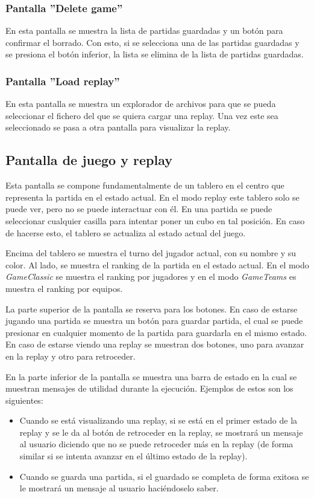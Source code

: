 \documentclass[14pt]{extreport}
\begin{document}
\subsubsection*{Pantalla ''Delete game''}
En esta pantalla se muestra la lista de partidas guardadas y un botón para confirmar el borrado. Con esto, si se selecciona una de las partidas guardadas y se presiona el botón inferior, la lista se elimina de la lista de partidas guardadas.

\subsubsection*{Pantalla ''Load replay''}
En esta pantalla se muestra un explorador de archivos para que se pueda seleccionar el fichero del que se quiera cargar una replay. Una vez este sea seleccionado se pasa a otra pantalla para visualizar la replay.

\subsection*{Pantalla de juego y replay}
Esta pantalla se compone fundamentalmente de un tablero en el centro que representa la partida en el estado actual. En el modo replay este tablero solo se puede ver, pero no se puede interactuar con él. En una partida se puede seleccionar cualquier casilla para intentar poner un cubo en tal posición. En caso de hacerse esto, el tablero se actualiza al estado actual del juego.

Encima del tablero se muestra el turno del jugador actual, con su nombre y su color. Al lado, se muestra el ranking de la partida en el estado actual. En el modo \textit{GameClassic} se muestra el ranking por jugadores y en el modo \textit{GameTeams} es muestra el ranking por equipos.

La parte superior de la pantalla se reserva para los botones. En caso de estarse jugando una partida se muestra un botón para guardar partida, el cual se puede presionar en cualquier momento de la partida para guardarla en el mismo estado. En caso de estarse viendo una replay se muestran dos botones, uno para avanzar en la replay y otro para retroceder.

En la parte inferior de la pantalla se muestra una barra de estado en la cual se muestran mensajes de utilidad durante la ejecución. Ejemplos de estos son los siguientes:
\begin{itemize}
\item Cuando se está visualizando una replay, si se está en el primer estado de la replay y se le da al botón de retroceder en la replay, se mostrará un mensaje al usuario diciendo que no se puede retroceder más en la replay (de forma similar si se intenta avanzar en el último estado de la replay).
\item Cuando se guarda una partida, si el guardado se completa de forma exitosa se le mostrará un mensaje al usuario haciéndoselo saber.
\end{itemize}
\end{document}
